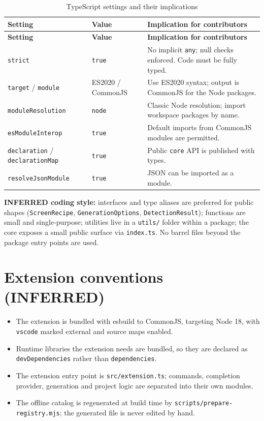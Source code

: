 \begin{longtable}{@{}L{4.4cm}L{2.6cm}L{7.2cm}@{}}
\caption{TypeScript settings and their implications}\\
\toprule
\textbf{Setting} & \textbf{Value} & \textbf{Implication for contributors} \\
\midrule
\endfirsthead
\toprule
\textbf{Setting} & \textbf{Value} & \textbf{Implication for contributors} \\
\midrule
\endhead
\texttt{strict} & \texttt{true} & No implicit \texttt{any}; null checks enforced.
Code must be fully typed. \\
\texttt{target} / \texttt{module} & ES2020 / CommonJS & Use ES2020 syntax; output is
CommonJS for the Node packages. \\
\texttt{moduleResolution} & \texttt{node} & Classic Node resolution; import
workspace packages by name. \\
\texttt{esModuleInterop} & \texttt{true} & Default imports from CommonJS modules
are permitted. \\
\texttt{declaration} / \texttt{declarationMap} & \texttt{true} & Public
\texttt{core} API is published with types. \\
\texttt{resolveJsonModule} & \texttt{true} & JSON can be imported as a module. \\
\bottomrule
\end{longtable}

\textbf{INFERRED coding style:} interfaces and type aliases are preferred for
public shapes (\texttt{ScreenRecipe}, \texttt{GenerationOptions},
\texttt{DetectionResult}); functions are small and single-purpose; utilities live
in a \texttt{utils/} folder within a package; the core exposes a small public
surface via \texttt{index.ts}. No barrel files beyond the package entry points
are used.

\section{Extension conventions (INFERRED)}

\begin{itemize}
  \item The extension is bundled with esbuild to CommonJS, targeting Node 18,
        with \texttt{vscode} marked external and source maps enabled.
  \item Runtime libraries the extension needs are bundled, so they are declared
        as \texttt{devDependencies} rather than \texttt{dependencies}.
  \item The extension entry point is \texttt{src/extension.ts}; commands,
        completion provider, generation and project logic are separated into
        their own modules.
  \item The offline catalog is regenerated at build time by
        \texttt{scripts/prepare-registry.mjs}; the generated file is never edited
        by hand.
\end{itemize}


